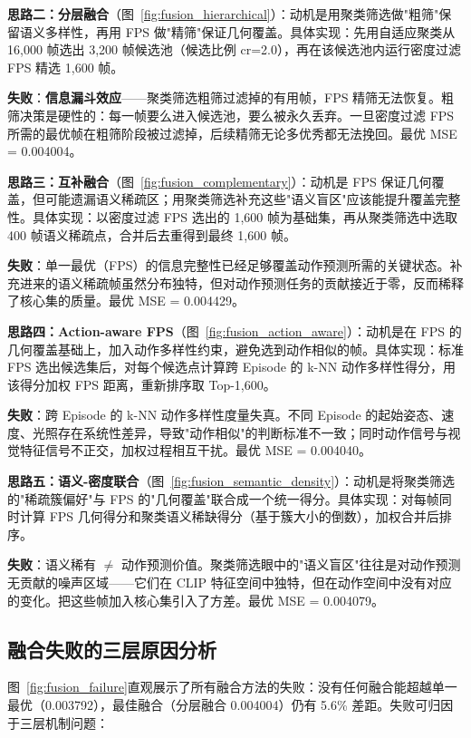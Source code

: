 \documentclass[12pt,a4paper]{article}
\begin{document}
\textbf{思路二：分层融合}（图~\ref{fig:fusion_hierarchical}）：动机是用聚类筛选做"粗筛"保留语义多样性，再用 FPS 做"精筛"保证几何覆盖。具体实现：先用自适应聚类从 16,000 帧选出 3,200 帧候选池（候选比例 cr=2.0），再在该候选池内运行密度过滤 FPS 精选 1,600 帧。


\textbf{失败}：\textbf{信息漏斗效应}——聚类筛选粗筛过滤掉的有用帧，FPS 精筛无法恢复。粗筛决策是硬性的：每一帧要么进入候选池，要么被永久丢弃。一旦密度过滤 FPS 所需的最优帧在粗筛阶段被过滤掉，后续精筛无论多优秀都无法挽回。最优 MSE = 0.004004。

\textbf{思路三：互补融合}（图~\ref{fig:fusion_complementary}）：动机是 FPS 保证几何覆盖，但可能遗漏语义稀疏区；用聚类筛选补充这些"语义盲区"应该能提升覆盖完整性。具体实现：以密度过滤 FPS 选出的 1,600 帧为基础集，再从聚类筛选中选取 400 帧语义稀疏点，合并后去重得到最终 1,600 帧。


\textbf{失败}：单一最优（FPS）的信息完整性已经足够覆盖动作预测所需的关键状态。补充进来的语义稀疏帧虽然分布独特，但对动作预测任务的贡献接近于零，反而稀释了核心集的质量。最优 MSE = 0.004429。

\textbf{思路四：Action-aware FPS}（图~\ref{fig:fusion_action_aware}）：动机是在 FPS 的几何覆盖基础上，加入动作多样性约束，避免选到动作相似的帧。具体实现：标准 FPS 选出候选集后，对每个候选点计算跨 Episode 的 k-NN 动作多样性得分，用该得分加权 FPS 距离，重新排序取 Top-1,600。


\textbf{失败}：跨 Episode 的 k-NN 动作多样性度量失真。不同 Episode 的起始姿态、速度、光照存在系统性差异，导致"动作相似"的判断标准不一致；同时动作信号与视觉特征信号不正交，加权过程相互干扰。最优 MSE = 0.004040。

\textbf{思路五：语义-密度联合}（图~\ref{fig:fusion_semantic_density}）：动机是将聚类筛选的"稀疏簇偏好"与 FPS 的"几何覆盖"联合成一个统一得分。具体实现：对每帧同时计算 FPS 几何得分和聚类语义稀缺得分（基于簇大小的倒数），加权合并后排序。


\textbf{失败}：语义稀有 $\neq$ 动作预测价值。聚类筛选眼中的"语义盲区"往往是对动作预测无贡献的噪声区域——它们在 CLIP 特征空间中独特，但在动作空间中没有对应的变化。把这些帧加入核心集引入了方差。最优 MSE = 0.004079。

\subsection{融合失败的三层原因分析}

图~\ref{fig:fusion_failure}直观展示了所有融合方法的失败：没有任何融合能超越单一最优（0.003792），最佳融合（分层融合 0.004004）仍有 5.6\% 差距。失败可归因于三层机制问题：
\end{document}

